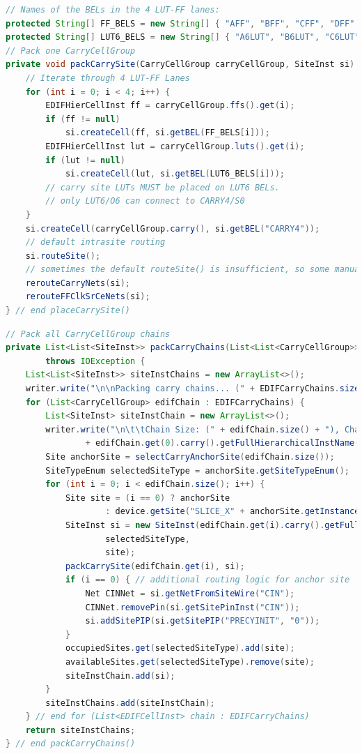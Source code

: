 \begin{lstlisting}[language=java, caption={Packing one \texttt{CarryCellGroup} into one \texttt{SLICEL} \texttt{SiteInst}.}, label={lst:single_carry_chains}]
// Names of the BELs in the 4 LUT-FF lanes:
protected String[] FF_BELS = new String[] { "AFF", "BFF", "CFF", "DFF" };
protected String[] LUT6_BELS = new String[] { "A6LUT", "B6LUT", "C6LUT", "D6LUT" };
// Pack one CarryCellGroup 
private void packCarrySite(CarryCellGroup carryCellGroup, SiteInst si) {
    // Iterate through 4 LUT-FF Lanes
    for (int i = 0; i < 4; i++) {
        EDIFHierCellInst ff = carryCellGroup.ffs().get(i);
        if (ff != null)
            si.createCell(ff, si.getBEL(FF_BELS[i]));
        EDIFHierCellInst lut = carryCellGroup.luts().get(i);
        if (lut != null)
            si.createCell(lut, si.getBEL(LUT6_BELS[i]));
        // carry site LUTs MUST be placed on LUT6 BELs.
        // only LUT6/O6 can connect to CARRY4/S0
    }
    si.createCell(carryCellGroup.carry(), si.getBEL("CARRY4"));
    // default intrasite routing
    si.routeSite();
    // sometimes the default routeSite() is insufficient, so some manual intervention is required
    rerouteCarryNets(si);
    rerouteFFClkSrCeNets(si);
} // end placeCarrySite()
\end{lstlisting}

\newpage
\begin{lstlisting}[language=java, caption={Packing \texttt{CarryCellGroup}s into \texttt{SLICEL} \texttt{SiteInst}s.}, label={lst:carry_chains}]
// Pack all CarryCellGroup chains
private List<List<SiteInst>> packCarryChains(List<List<CarryCellGroup>> EDIFCarryChains)
        throws IOException {
    List<List<SiteInst>> siteInstChains = new ArrayList<>();
    writer.write("\n\nPacking carry chains... (" + EDIFCarryChains.size() + ")");
    for (List<CarryCellGroup> edifChain : EDIFCarryChains) {
        List<SiteInst> siteInstChain = new ArrayList<>();
        writer.write("\n\t\tChain Size: (" + edifChain.size() + "), Chain Anchor: "
                + edifChain.get(0).carry().getFullHierarchicalInstName());
        Site anchorSite = selectCarryAnchorSite(edifChain.size());
        SiteTypeEnum selectedSiteType = anchorSite.getSiteTypeEnum();
        for (int i = 0; i < edifChain.size(); i++) {
            Site site = (i == 0) ? anchorSite
                    : device.getSite("SLICE_X" + anchorSite.getInstanceX() + "Y" + (anchorSite.getInstanceY() + i));
            SiteInst si = new SiteInst(edifChain.get(i).carry().getFullHierarchicalInstName(), design,
                    selectedSiteType,
                    site);
            packCarrySite(edifChain.get(i), si);
            if (i == 0) { // additional routing logic for anchor site
                Net CINNet = si.getNetFromSiteWire("CIN");
                CINNet.removePin(si.getSitePinInst("CIN"));
                si.addSitePIP(si.getSitePIP("PRECYINIT", "0"));
            }
            occupiedSites.get(selectedSiteType).add(site);
            availableSites.get(selectedSiteType).remove(site);
            siteInstChain.add(si);
        }
        siteInstChains.add(siteInstChain);
    } // end for (List<EDIFCellInst> chain : EDIFCarryChains)
    return siteInstChains;
} // end packCarryChains()
\end{lstlisting}


